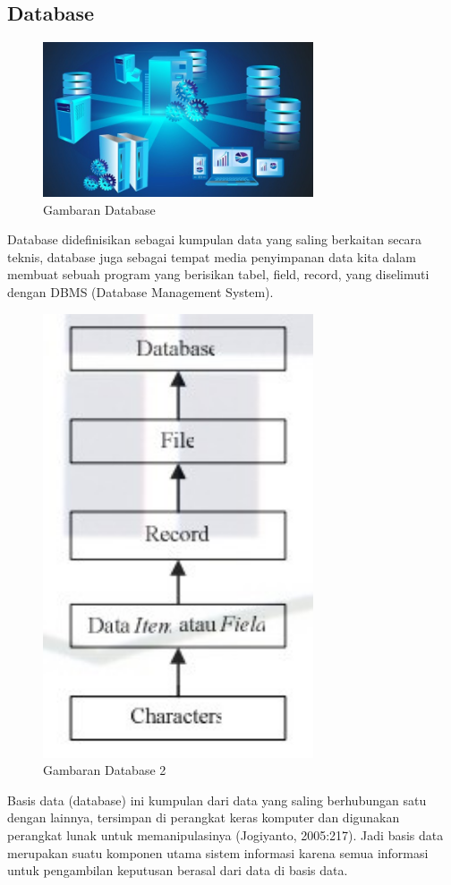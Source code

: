 \subsection{Database}
	\begin{figure}[H]
		\includegraphics[width=8cm]{figures/db.jpg}
		\centering
		\caption{Gambaran Database}
	\end{figure}
Database didefinisikan sebagai kumpulan data yang saling berkaitan secara teknis, database juga sebagai tempat media penyimpanan data kita dalam membuat sebuah program yang berisikan tabel, field, record, yang diselimuti dengan DBMS (Database Management System).
	\begin{figure}[H]
		\includegraphics[width=8cm]{figures/db2.jpg}
		\centering
		\caption{Gambaran Database 2}
	\end{figure}
Basis data (database) ini kumpulan dari data yang saling berhubungan satu dengan lainnya, tersimpan di perangkat keras komputer dan digunakan perangkat lunak untuk memanipulasinya (Jogiyanto, 2005:217). Jadi basis data merupakan suatu komponen utama sistem informasi karena semua informasi untuk pengambilan keputusan berasal dari data di basis data.

